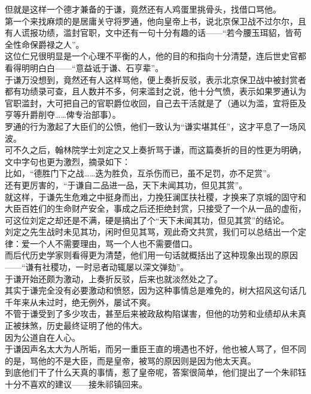 \begin{multicols}{\theparacolNo}
但就是这样一个德才兼备的于谦，竟然还有人鸡蛋里挑骨头，找借口骂他。\\

第一个来找麻烦的是居庸关守将罗通，他向皇帝上书，说北京保卫战不过尔尔，且有人谎报功绩，滥封官职，文中还有一句十分有趣的话——“若今腰玉珥貂，皆苟全性命保爵禄之人”。\\

这位仁兄很明显是一个心理不平衡的人，他的目的和指向十分清楚，连后世史官都看得明明白白——“意益诋于谦、石亨辈”。\\

于谦万没想到，竟然还有人这样骂他，便上奏折反驳，表示北京保卫战中被封赏者都有功绩录可查，且人数并不多，何来滥封之说，他十分气愤，表示如果罗通认为官职滥封，大可把自己的官职爵位收回，自己去干活就是了（通以为滥，宜将臣及亨等升爵削夺……俾专治部事）。\\

罗通的行为激起了大臣们的公愤，他们一致认为“谦实堪其任”，这才平息了一场风波。\\

可不久之后，翰林院学士刘定之又上奏折骂于谦，而这篇奏折的目的性更为明确，文中字句也更为激烈，摘录如下：\\

比如，“德胜门下之战……迭为胜负，互杀伤而已，虽不足罚，亦不足赏”。\\

还有更厉害的，“于谦自二品进一品，天下未闻其功，但见其赏”。\\

就这样，于谦先生危难之中挺身而出，力挽狂澜匡扶社稷，才换来了京城的固守和大臣百姓们的生命财产安全，事成之后还拒绝封赏，只接受了一个从一品的虚衔，可这位刘定之却还是不满，硬是搞出了个“天下未闻其功，但见其赏”的结论。\\

刘定之先生战时未见其功，闲时但见其骂，观此奇文共赏，我们可以总结出一个定律：爱一个人不需要理由，骂一个人也不需要借口。\\

而后代历史学家则看得更为清楚，他们用一句话就概括出了这种现象出现的原因——“谦有社稷功，一时忌者动辄屡以深文弹劾”。\\

于谦开始还颇为激动，上奏折反驳，后来也就淡然处之了。\\

其实于谦完全没有必要激动和愤怒，因为这种事情总是难免的，树大招风这句话几千年来从未过时，绝无例外，屡试不爽。\\

不管于谦受到了多少攻击，甚至后来被政敌构陷谋害，但他的功劳和业绩却从未真正被抹煞，历史最终证明了他的伟大。\\

因为公道自在人心。\\

于谦因声名太大为人所垢，而另一重臣王直的境遇也不好，他也被人骂了，但不同的是，骂他的不是大臣，而是皇帝，被骂的原因则是因为他太天真。\\

到底他们干了什么天真的事情，惹了皇帝呢，答案很简单，他们提出了一个朱祁钰十分不喜欢的建议——接朱祁镇回来。\\
\ifnum{}
	\end{multicols}
\fi
\newpage

